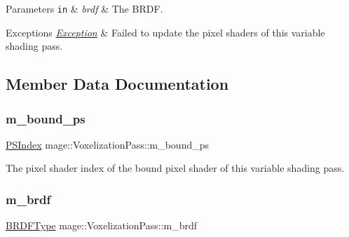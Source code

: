 \begin{DoxyParams}[1]{Parameters}
\mbox{\tt in}  & {\em brdf} & The B\+R\+DF. \\
\hline
\end{DoxyParams}

\begin{DoxyExceptions}{Exceptions}
{\em \hyperlink{classmage_1_1_exception}{Exception}} & Failed to update the pixel shaders of this variable shading pass. \\
\hline
\end{DoxyExceptions}


\subsection{Member Data Documentation}
\hypertarget{classmage_1_1_voxelization_pass_ab00023b5a819f5d42134308dfbd1c012}{}\label{classmage_1_1_voxelization_pass_ab00023b5a819f5d42134308dfbd1c012} 
\subsubsection{\texorpdfstring{m\+\_\+bound\+\_\+ps}{m\_bound\_ps}}
{\footnotesize\ttfamily \hyperlink{classmage_1_1_voxelization_pass_a3632bab7b0039dbbe10569618ae57589}{P\+S\+Index} mage\+::\+Voxelization\+Pass\+::m\+\_\+bound\+\_\+ps\hspace{0.3cm}{\ttfamily [private]}}

The pixel shader index of the bound pixel shader of this variable shading pass. \hypertarget{classmage_1_1_voxelization_pass_a35943c47608768e49227d3f6bf8b4996}{}\label{classmage_1_1_voxelization_pass_a35943c47608768e49227d3f6bf8b4996} 
\subsubsection{\texorpdfstring{m\+\_\+brdf}{m\_brdf}}
{\footnotesize\ttfamily \hyperlink{namespacemage_af1044f87544bc38427766a8c795d2f26}{B\+R\+D\+F\+Type} mage\+::\+Voxelization\+Pass\+::m\+\_\+brdf\hspace{0.3cm}{\ttfamily [private]}}

